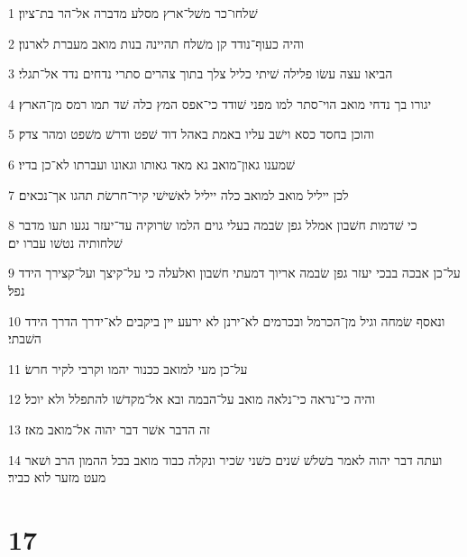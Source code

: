 \par 1 שׁלחו־כר משׁל־ארץ מסלע מדברה אל־הר בת־ציון׃
\par 2 והיה כעוף־נודד קן משׁלח תהיינה בנות מואב מעברת לארנון׃
\par 3 הביאו עצה עשׂו פלילה שׁיתי כליל צלך בתוך צהרים סתרי נדחים נדד אל־תגלי׃
\par 4 יגורו בך נדחי מואב הוי־סתר למו מפני שׁודד כי־אפס המץ כלה שׁד תמו רמס מן־הארץ׃
\par 5 והוכן בחסד כסא וישׁב עליו באמת באהל דוד שׁפט ודרשׁ משׁפט ומהר צדק׃
\par 6 שׁמענו גאון־מואב גא מאד גאותו וגאונו ועברתו לא־כן בדיו׃
\par 7 לכן ייליל מואב למואב כלה ייליל לאשׁישׁי קיר־חרשׂת תהגו אך־נכאים׃
\par 8 כי שׁדמות חשׁבון אמלל גפן שׂבמה בעלי גוים הלמו שׂרוקיה עד־יעזר נגעו תעו מדבר שׁלחותיה נטשׁו עברו ים׃
\par 9 על־כן אבכה בבכי יעזר גפן שׂבמה אריוך דמעתי חשׁבון ואלעלה כי על־קיצך ועל־קצירך הידד נפל׃
\par 10 ונאסף שׂמחה וגיל מן־הכרמל ובכרמים לא־ירנן לא ירעע יין ביקבים לא־ידרך הדרך הידד השׁבתי׃
\par 11 על־כן מעי למואב ככנור יהמו וקרבי לקיר חרשׂ׃
\par 12 והיה כי־נראה כי־נלאה מואב על־הבמה ובא אל־מקדשׁו להתפלל ולא יוכל׃
\par 13 זה הדבר אשׁר דבר יהוה אל־מואב מאז׃
\par 14 ועתה דבר יהוה לאמר בשׁלשׁ שׁנים כשׁני שׂכיר ונקלה כבוד מואב בכל ההמון הרב ושׁאר מעט מזער לוא כביר׃

\chapter{17}

